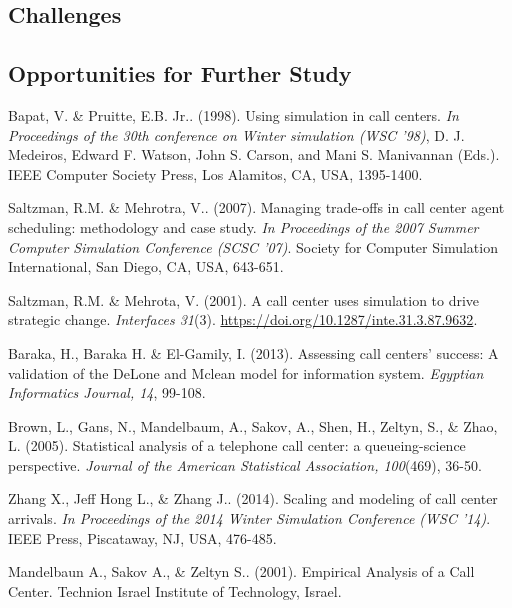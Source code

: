 \documentclass[12pt,twocolumn]{article}
\begin{document}
	\subsection{Challenges}

	\subsection{Opportunities for Further Study}














\newpage
\clearpage
{}
\begin{thebibliography}{7}
	
	Bapat, V. \& Pruitte, E.B. Jr.. (1998). Using simulation in call centers. \textit{In Proceedings of the 30th conference on Winter simulation (WSC '98)}, D. J. Medeiros, Edward F. Watson, John S. Carson, and Mani S. Manivannan (Eds.). IEEE Computer Society Press, Los Alamitos, CA, USA, 1395-1400.
	
	Saltzman, R.M. \& Mehrotra, V.. (2007). Managing trade-offs in call center agent scheduling: methodology and case study. \textit{In Proceedings of the 2007 Summer Computer Simulation Conference (SCSC '07)}. Society for Computer Simulation International, San Diego, CA, USA, 643-651.
	
	Saltzman, R.M. \& Mehrota, V. (2001). A call center uses simulation to drive strategic change. \textit{Interfaces 31}(3). \href{https://doi.org/10.1287/inte.31.3.87.9632}{https://doi.org/10.1287/inte.31.3.87.9632}. 
	
	
	Baraka, H., Baraka H. \& El-Gamily, I. (2013). Assessing call centers' success: A validation of the DeLone and Mclean model for information system. \textit{Egyptian Informatics Journal, 14}, 99-108.

	Brown, L., Gans, N., Mandelbaum, A., Sakov, A., Shen, H., Zeltyn, S., \& Zhao, L. (2005). Statistical analysis of a telephone call center: a queueing-science perspective. \textit{Journal of the American Statistical Association, 100}(469), 36-50.

	Zhang X., Jeff Hong L., \& Zhang J.. (2014). Scaling and modeling of call center arrivals. \textit{In Proceedings of the 2014 Winter Simulation Conference (WSC '14)}. IEEE Press, Piscataway, NJ, USA, 476-485.

	Mandelbaun A., Sakov A., \& Zeltyn S.. (2001). Empirical Analysis of a Call Center. Technion Israel Institute of Technology, Israel.

\end{thebibliography}
\end{document}
